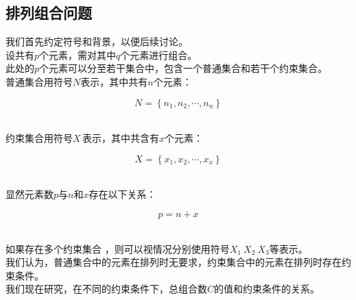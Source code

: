 \documentclass[UTF8]{ctexart}
\newcommand{\rnum}[1]{\uppercase\expandafter{\romannumeral #1\relax}}
\begin{document}
\newpage

\subsection{排列组合问题\rnum{2}}
    我们首先约定符号和背景，以便后续讨论。\\[3mm]
    设共有$p$个元素，需对其中$q$个元素进行组合。\\[3mm]
    此处的$p$个元素可以分至若干集合中，包含一个普通集合和若干个约束集合。\\[3mm]
    普通集合用符号$N$表示，其中共有$n$个元素：
    \begin{large}
        \begin{equation*}
            N=\left\{n_1,n_2,\cdots,n_n\right\}
        \end{equation*}
    \end{large}\\
    约束集合用符号$X\,$表示，其中共含有$x$个元素：
    \begin{large}
        \begin{equation*}
            X=\left\{x_1,x_2,\cdots,x_x\right\}
        \end{equation*}
    \end{large}\\
    显然元素数$p$与$n$和$x$存在以下关系：
    \begin{large}
        \begin{equation*}
            p=n+x
        \end{equation*}
    \end{large}\\
    如果存在多个约束集合 ，则可以视情况分别使用符号$X_1~X_2~X_3$等表示。\\[3mm]
    我们认为，普通集合中的元素在排列时无要求，约束集合中的元素在排列时存在约束条件。\\[3mm]
    我们现在研究，在不同的约束条件下，总组合数$C$的值和约束条件的关系。
\end{document}
